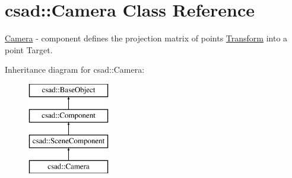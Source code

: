 \hypertarget{classcsad_1_1_camera}{\section{csad\-:\-:Camera Class Reference}
\label{classcsad_1_1_camera}
}


\hyperlink{classcsad_1_1_camera}{Camera} -\/ component defines the projection matrix of points \hyperlink{classcsad_1_1_transform}{Transform} into a point Target.  


Inheritance diagram for csad\-:\-:Camera\-:\begin{figure}[H]
\begin{center}
\leavevmode
\includegraphics[height=4.000000cm]{classcsad_1_1_camera}
\end{center}
\end{figure}

